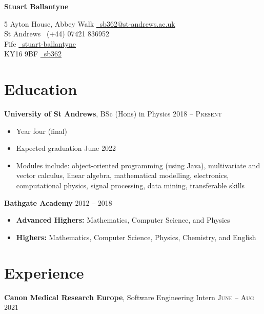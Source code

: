 \documentclass{article}
\begin{document}
	
	\begin{center}
		\par{{\Large \textbf{Stuart Ballantyne}}\par}
	\end{center}
	
	\begin{center}
		5 Ayton House, Abbey Walk \hfill \href{mailto:sb362@st-andrews.ac.uk}{\faEnvelope\ sb362@st-andrews.ac.uk}\\
		St Andrews \hfill \faMobile\ (+44) 07421 836952\\
		Fife \hfill \href{https://www.linkedin.com/in/stuart-ballantyne/}{\faLinkedin\ stuart-ballantyne}\\
		KY16 9BF \hfill \href{https://github.com/sb362}{\faGithub\ sb362}
	\end{center}
	
	\section*{Education}
		\textbf{University of St Andrews}, BSc (Hons) in Physics \hfill \textsc{2018 -- Present}
		\begin{itemize}
			\item Year four (final)
			\item Expected graduation June 2022
			\item Modules include: object-oriented programming (using Java), multivariate and vector calculus, linear algebra, mathematical modelling, electronics, computational physics, signal processing, data mining, transferable skills
		\end{itemize}
		\bigskip
		\textbf{Bathgate Academy} \hfill \textsc{2012 -- 2018}
		\begin{itemize}
			\item \textbf{Advanced Highers:} Mathematics, Computer Science, and Physics
			\item \textbf{Highers:} Mathematics, Computer Science, Physics, Chemistry, and English
		\end{itemize}	
	
	\section*{Experience}
		\textbf{Canon Medical Research Europe}, Software Engineering Intern \hfill \textsc{June -- Aug 2021}
		
\end{document}
